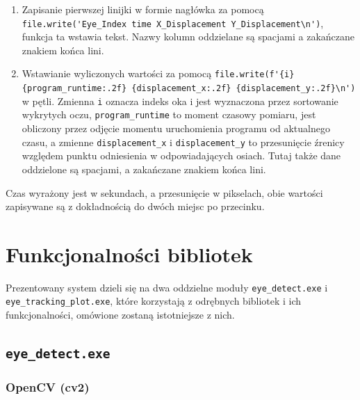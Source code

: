 \documentclass[a4paper,twoside,12pt]{book}
\begin{document}
\begin{enumerate}
	\item Zapisanie pierwszej linijki w formie nagłówka za pomocą \lstinline|file.write('Eye_Index time X_Displacement Y_Displacement\n')|, funkcja ta wstawia tekst. Nazwy kolumn oddzielane są spacjami a zakańczane znakiem końca lini.
	\item Wstawianie wyliczonych wartości za pomocą \lstinline|file.write(f'{i} {program_runtime:.2f} {displacement_x:.2f} {displacement_y:.2f}\n')| w pętli. Zmienna \texttt{i} oznacza indeks oka i jest wyznaczona przez sortowanie wykrytych oczu, \texttt{program\-\_runtime} to moment czasowy pomiaru, jest obliczony przez odjęcie momentu uruchomienia programu od aktualnego czasu, a zmienne \texttt{displacement\-\_x} i \texttt{displacement\-\_y} to przesunięcie źrenicy względem punktu odniesienia w odpowiadających osiach. Tutaj także dane oddzielone są spacjami, a zakańczane znakiem końca lini.
\end{enumerate}

Czas wyrażony jest w sekundach, a przesunięcie w pikselach, obie wartości zapisywane są z dokładnością do dwóch miejsc po przecinku.

\section{Funkcjonalności bibliotek}
\label{sec:Funkcjonalnosci-bibliotek}

Prezentowany system dzieli się na dwa oddzielne moduły \texttt{eye\-\_detect\-.exe} i \texttt{eye\_\-tracking\_\-plot\-.exe}, które korzystają z odrębnych bibliotek i ich funkcjonalności, omówione zostaną istotniejsze z nich.

\subsection{\texttt{eye\-\_detect\-.exe}}
\label{subsec:eye-detect.exe}

\subsubsection{OpenCV (cv2)}
\end{document}
